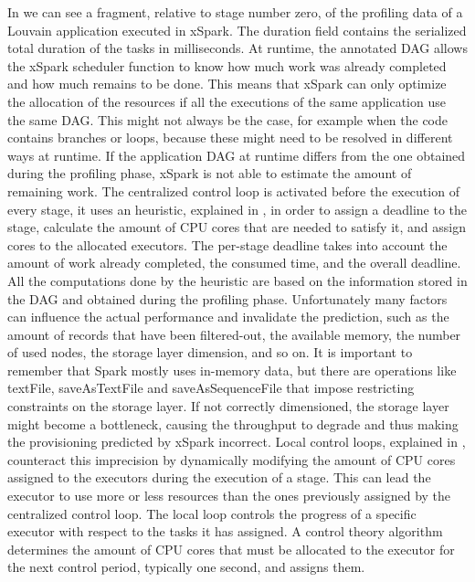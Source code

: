 In  we can see a fragment, relative to stage number zero, of the profiling data of a Louvain application executed in xSpark.
The duration field contains the serialized total duration of the tasks in milliseconds.
At runtime, the annotated DAG allows the xSpark scheduler function to know how much
work was already completed and how much remains to be done. This means that xSpark can only optimize the allocation of the resources if all the executions of the same application use the same DAG. This might not always be the case, for example when the
code contains branches or loops, because these might need to be resolved
in different ways at runtime. If the application DAG at runtime differs from the one obtained during the profiling phase, xSpark is
not able to estimate the amount of remaining work.
The centralized control loop is activated before the execution of
every stage, it uses an heuristic, explained in , in order
to assign a deadline to the stage, calculate the amount of CPU cores
that are needed to satisfy it, and assign cores to the allocated executors.
The per-stage deadline takes into account the amount of work
already completed, the consumed time, and the overall deadline. All
the computations done by the heuristic are based on the information
stored in the DAG and obtained during the profiling phase. Unfortunately
many factors can influence the actual performance and
invalidate the prediction, such as the amount of records that have
been filtered-out, the available memory, the number of used nodes,
the storage layer dimension, and so on. It is important to remember
that Spark mostly uses in-memory data, but there are operations like
textFile, saveAsTextFile and saveAsSequenceFile that impose restricting
constraints on the storage layer. If not correctly dimensioned,
the storage layer might become a bottleneck, causing the throughput
to degrade and thus making the provisioning predicted by xSpark
incorrect.
Local control loops, explained in , counteract this imprecision
by dynamically modifying the amount of CPU cores assigned
to the executors during the execution of a stage. This can lead
the executor to use more or less resources than the ones previously
assigned by the centralized control loop. The local loop controls the
progress of a specific executor with respect to the tasks it has assigned.
A control theory algorithm determines the amount of CPU cores that
must be allocated to the executor for the next control period, typically
one second, and assigns them.
